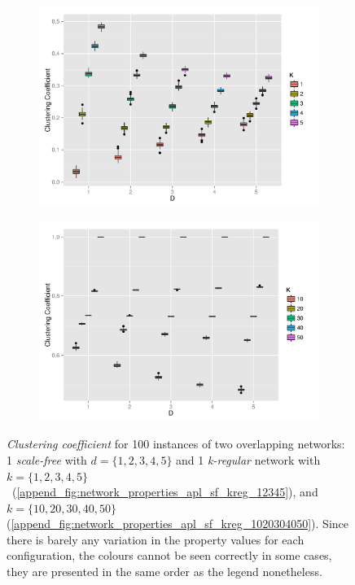 \begin{figure}[H]
\centering
\begin{subfigure}{.49\linewidth}
  \centering
 \includegraphics[width=1\linewidth]{"../analysis/pdf/network_properties_cc_sf_kregular_12345"}
 \caption{}
 \label{append_fig:network_properties_cc_sf_kreg_12345}
\end{subfigure}%
\begin{subfigure}{.49\linewidth}
  \centering
 \includegraphics[width=1\linewidth]{"../analysis/pdf/network_properties_cc_sf_kregular_1020304050"}
 \caption{}
 \label{append_fig:network_properties_cc_sf_kreg_1020304050}
\end{subfigure}

\begin{minipage}{0.9\linewidth}
\vspace{0.2cm}
\caption{\textit{Clustering coefficient} for 100 instances of two overlapping networks: 1 \textit{scale-free} with $d=\{1,2,3,4,5\}$ and 1 \textit{k-regular} network with ~$k=\{1,2,3,4,5\}$~(\ref{append_fig:network_properties_apl_sf_kreg_12345}), and  $k=\{10,20,30,40,50\}$ (\ref{append_fig:network_properties_apl_sf_kreg_1020304050}). Since there is barely any variation in the property values for each configuration, the colours cannot be seen correctly in some cases, they are presented in the same order as the legend nonetheless.}
\label{append_fig:network_properties_cc_sf_kreg}
\end{minipage}

\end{figure}
